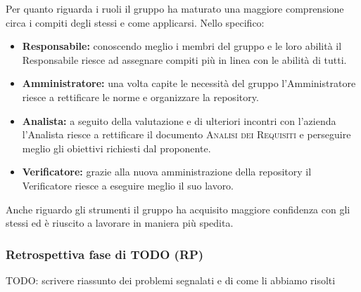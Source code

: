 \documentclass[../piano_di_qualifica.tex]{subfiles}
\begin{document}
Per quanto riguarda i ruoli il gruppo ha maturato una maggiore comprensione circa i compiti degli stessi e come applicarsi. Nello specifico:
\begin{itemize}
	\item \textbf{Responsabile:} conoscendo meglio i membri del gruppo e le loro abilità il Responsabile riesce ad assegnare compiti più in linea con le abilità di tutti.
	\item \textbf{Amministratore:} una volta capite le necessità del gruppo l'Amministratore riesce a rettificare le norme e organizzare la repository.
	\item \textbf{Analista:} a seguito della valutazione e di ulteriori incontri con l'azienda l'Analista riesce a rettificare il documento \textsc{Analisi dei Requisiti} e perseguire meglio gli obiettivi richiesti dal proponente.
	\item \textbf{Verificatore:} grazie alla nuova amministrazione della repository il Verificatore riesce a eseguire meglio il suo lavoro.
\end{itemize}

Anche riguardo gli strumenti il gruppo ha acquisito maggiore confidenza con gli stessi ed è riuscito a lavorare in maniera più spedita.

\subsubsection{Retrospettiva fase di TODO (RP)}
\label{par:retrospettiva-RP}

TODO: scrivere riassunto dei problemi segnalati e di come li abbiamo risolti
\end{document}
